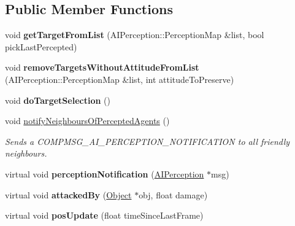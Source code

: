 \subsection*{\-Public \-Member \-Functions}
\begin{DoxyCompactItemize}
\item 
\hypertarget{classAIHandlerBat_aa8367eed1b40136350017b5f4600fd15}{
void {\bfseries get\-Target\-From\-List} (\-A\-I\-Perception\-::\-Perception\-Map \&list, bool pick\-Last\-Percepted)}
\label{df/d90/classAIHandlerBat_aa8367eed1b40136350017b5f4600fd15}

\item 
\hypertarget{classAIHandlerBat_a70aef0197e2625b344909a5bbe41d734}{
void {\bfseries remove\-Targets\-Without\-Attitude\-From\-List} (\-A\-I\-Perception\-::\-Perception\-Map \&list, int attitude\-To\-Preserve)}
\label{df/d90/classAIHandlerBat_a70aef0197e2625b344909a5bbe41d734}

\item 
\hypertarget{classAIHandlerBat_a6e6cea09fcb6aba2f48afb8d4abe3e80}{
void {\bfseries do\-Target\-Selection} ()}
\label{df/d90/classAIHandlerBat_a6e6cea09fcb6aba2f48afb8d4abe3e80}

\item 
\hypertarget{classAIHandlerBat_a216bba342106f58ed01229280889631c}{
void \hyperlink{classAIHandlerBat_a216bba342106f58ed01229280889631c}{notify\-Neighbours\-Of\-Percepted\-Agents} ()}
\label{df/d90/classAIHandlerBat_a216bba342106f58ed01229280889631c}

\begin{DoxyCompactList}\small\item\em \-Sends a \-C\-O\-M\-P\-M\-S\-G\-\_\-\-A\-I\-\_\-\-P\-E\-R\-C\-E\-P\-T\-I\-O\-N\-\_\-\-N\-O\-T\-I\-F\-I\-C\-A\-T\-I\-O\-N to all friendly neighbours. \end{DoxyCompactList}\item 
\hypertarget{classAIHandlerBat_abd619bf0e8e3ad05711ca79f2850323b}{
virtual void {\bfseries perception\-Notification} (\hyperlink{classAIPerception}{\-A\-I\-Perception} $\ast$msg)}
\label{df/d90/classAIHandlerBat_abd619bf0e8e3ad05711ca79f2850323b}

\item 
\hypertarget{classAIHandlerBat_a4033a9f60581fb9abdd24981c3ed1bcc}{
virtual void {\bfseries attacked\-By} (\hyperlink{classObject}{\-Object} $\ast$obj, float damage)}
\label{df/d90/classAIHandlerBat_a4033a9f60581fb9abdd24981c3ed1bcc}

\item 
\hypertarget{classAIHandlerBat_af11978aa6e8e975a0221de7a941327c6}{
virtual void {\bfseries pos\-Update} (float time\-Since\-Last\-Frame)}
\label{df/d90/classAIHandlerBat_af11978aa6e8e975a0221de7a941327c6}


\end{DoxyCompactItemize}
